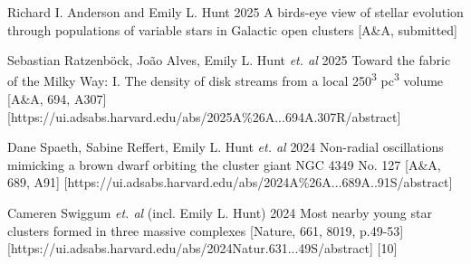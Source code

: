 \begin{etaremune}
    \item \publication 
        {Richard I. Anderson and Emily L. Hunt}
        {2025}
        {A birds-eye view of stellar evolution through populations of variable stars in Galactic open clusters}
        [A\&A, submitted]
    \item \publication 
        {Sebastian Ratzenböck, João Alves, Emily L. Hunt \emph{et. al}}
        {2025}
        {Toward the fabric of the Milky Way: I. The density of disk streams from a local 250\textsuperscript{3} pc\textsuperscript{3} volume}
        [A\&A, 694, A307]
        [https://ui.adsabs.harvard.edu/abs/2025A\%26A...694A.307R/abstract]
    \item \publication
        {Dane Spaeth, Sabine Reffert, Emily L. Hunt \emph{et. al}}
        {2024}
        {Non-radial oscillations mimicking a brown dwarf orbiting the cluster giant NGC 4349 No. 127}
        [A\&A, 689, A91]
        [https://ui.adsabs.harvard.edu/abs/2024A\%26A...689A..91S/abstract]
    \item \publication
        {Cameren Swiggum \emph{et. al} (incl. Emily L. Hunt)}
        {2024}
        {Most nearby young star clusters formed in three massive complexes }
        [Nature, 661, 8019, p.49-53]
        [https://ui.adsabs.harvard.edu/abs/2024Natur.631...49S/abstract]
        [10]
\end{etaremune}
